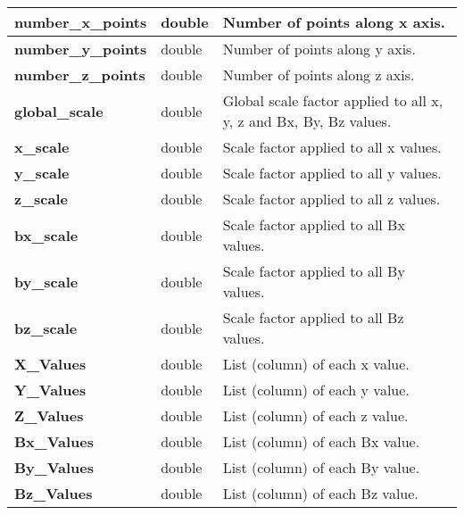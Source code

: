 \begin{center}
\tabletail{}
\tablelasttail{}
\begin{supertabular}{|m{3.665cm}|m{2.305cm}|m{11.025001cm}|}
\hline
{\ttfamily\bfseries number\_x\_points} &
double &
Number of points along x axis.\\\hline
{\ttfamily\bfseries number\_y\_points} &
double &
Number of points along y axis.\\\hline
{\ttfamily\bfseries number\_z\_points} &
double &
Number of points along z axis.\\\hline
{\ttfamily\bfseries global\_scale} &
double &
Global scale factor applied to all x, y, z and Bx, By, Bz values.\\\hline
{\ttfamily\bfseries x\_scale} &
double &
Scale factor applied to all x values.\\\hline
{\ttfamily\bfseries y\_scale} &
double &
Scale factor applied to all y values.\\\hline
{\ttfamily\bfseries z\_scale} &
double &
Scale factor applied to all z values.\\\hline
{\ttfamily\bfseries bx\_scale} &
double &
Scale factor applied to all Bx values.\\\hline
{\ttfamily\bfseries by\_scale} &
double &
Scale factor applied to all By values.\\\hline
{\ttfamily\bfseries bz\_scale} &
double &
Scale factor applied to all Bz values.\\\hline
{\ttfamily\bfseries X\_Values} &
double &
List (column) of each x value.\\\hline
{\ttfamily\bfseries Y\_Values} &
double &
List (column) of each y value.\\\hline
{\ttfamily\bfseries Z\_Values} &
double &
List (column) of each z value.\\\hline
{\ttfamily\bfseries Bx\_Values} &
double &
List (column) of each Bx value.\\\hline
{\ttfamily\bfseries By\_Values} &
double &
List (column) of each By value.\\\hline
{\ttfamily\bfseries Bz\_Values} &
double &
List (column) of each Bz value.\\\hline
\end{supertabular}
\end{center}
